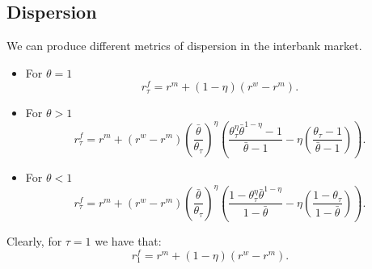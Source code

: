 \subsection{Dispersion}

{ We can produce different metrics of dispersion in the
interbank market. }
\begin{itemize}
\item { For $\theta=1$
\[
r_{\tau}^{f}=r^{m}+(1-\eta)\left(r^{w}-r^{m}\right).
\]
}
\item { For $\theta>1$
\[
r_{\tau}^{f}=r^{m}+\left(r^{w}-r^{m}\right)\left(\frac{\bar{\theta}}{\theta_{\tau}}\right)^{\eta}\left(\frac{\theta_{\tau}^{\eta}\bar{\theta}^{1-\eta}-1}{\bar{\theta}-1}-\eta\left(\frac{\theta_{\tau}-1}{\bar{\theta}-1}\right)\right).
\]
}
\item { For $\theta<1$
\[
r_{\tau}^{f}=r^{m}+\left(r^{w}-r^{m}\right)\left(\frac{\bar{\theta}}{\theta_{\tau}}\right)^{\eta}\left(\frac{1-\theta_{\tau}^{\eta}\bar{\theta}^{1-\eta}}{1-\bar{\theta}}-\eta\left(\frac{1-\theta_{\tau}}{1-\bar{\theta}}\right)\right).
\]
}
\end{itemize}
{ Clearly, for $\tau=1$ we have that:
\[
r_{1}^{f}=r^{m}+(1-\eta)\left(r^{w}-r^{m}\right).
\]
}

